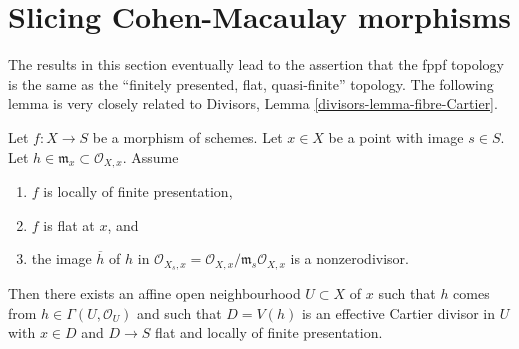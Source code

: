 \section{Slicing Cohen-Macaulay morphisms}
\label{section-slicing-CM}

\noindent
The results in this section eventually lead to the assertion that
the fppf topology is the same as the
``finitely presented, flat, quasi-finite'' topology.
The following lemma is very closely related to
Divisors, Lemma \ref{divisors-lemma-fibre-Cartier}.

\begin{lemma}
\label{lemma-slice-given-element}
Let $f : X \to S$ be a morphism of schemes.
Let $x \in X$ be a point with image $s \in S$.
Let $h \in \mathfrak m_x \subset \mathcal{O}_{X, x}$.
Assume
\begin{enumerate}
\item $f$ is locally of finite presentation,
\item $f$ is flat at $x$, and
\item the image $\overline{h}$ of $h$ in
$\mathcal{O}_{X_s, x} = \mathcal{O}_{X, x}/\mathfrak m_s\mathcal{O}_{X, x}$
is a nonzerodivisor.
\end{enumerate}
Then there exists an affine open neighbourhood $U \subset X$ of $x$
such that $h$ comes from $h \in \Gamma(U, \mathcal{O}_U)$ and such
that $D = V(h)$ is an effective Cartier divisor in $U$ with $x \in D$ and
$D \to S$ flat and locally of finite presentation.
\end{lemma}


